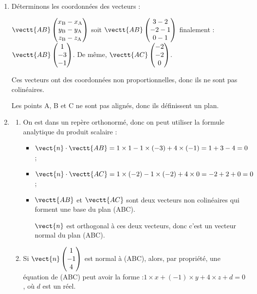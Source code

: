 \begin{enumerate}
	\item Déterminons les coordonnées des vecteurs :

	$\vectt{AB} \begin{pmatrix}
		x_{\mathrm{B}} - x_{\mathrm{A}}\\
		y_{\mathrm{B}} - y_{\mathrm{A}}\\
		z_{\mathrm{B}} - z_{\mathrm{A}} \end{pmatrix} $
	\quad soit \quad $\vectt{AB} \begin{pmatrix} 3-2\\-2-1\\0-1 \end{pmatrix} $
	\quad finalement :\quad $\vectt{AB} \begin{pmatrix} 1\\-3\\-1\end{pmatrix} $.
	\quad De même, \quad $\vectt{AC} \begin{pmatrix} -2\\-2\\0 \end{pmatrix} $.

	Ces vecteurs ont des coordonnées non proportionnelles, donc ils ne sont pas colinéaires.

	Les points A, B et C ne sont pas alignés, donc ils définissent un plan.

	\item \begin{enumerate}
		\item On est dans un repère orthonormé, donc on peut utiliser la formule analytique du produit scalaire :

		\begin{itemize}
			\item $\vect{n} \cdot \vectt{AB} = 1 \times 1 -  1 \times  (-3) + 4  \times  (-1) = 1 + 3 - 4 = 0$;
			\item $\vect{n} \cdot \vectt{AC} = 1 \times (-2) -  1 \times  (-2) + 4  \times  0 = -2 + 2 + 0 = 0$;
			\item $\vectt{AB}$ et $\vectt{AC}$ sont deux vecteurs non colinéaires qui forment une base du plan (ABC).

			$\vect{n}$ est orthogonal à ces deux vecteurs, donc c'est un vecteur normal du plan (ABC).
		\end{itemize}
		\item Si $\vect{n}\begin{pmatrix} 1\\-1\\4 \end{pmatrix}$ est normal à (ABC), alors, par propriété, une équation de (ABC) peut avoir la forme :\quad $1\times x + (-1) \times y + 4 \times z + d = 0$, \quad où $d$ est un réel.


\end{enumerate}
\end{enumerate}
